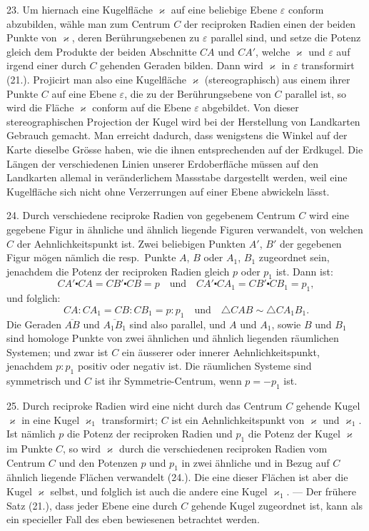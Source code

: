 23. Um hiernach eine Kugelfl\"ache $\varkappa$ auf eine beliebige
Ebene $\varepsilon$ conform abzubilden, w\"ahle man zum Centrum $C$
der reciproken Radien einen der beiden Punkte von $\varkappa$, deren
Ber\"uhrungsebenen zu $\varepsilon$ parallel sind, und setze die Potenz
gleich dem Produkte der beiden Abschnitte $CA$ und $CA'$,
welche $\varkappa$ und $\varepsilon$ auf irgend einer durch $C$ gehenden Geraden
bilden. Dann wird $\varkappa$ in $\varepsilon$ transformirt (21.). Projicirt man
also eine Kugelfl\"ache $\varkappa$ (stereographisch) aus einem ihrer
Punkte $C$ auf eine Ebene $\varepsilon$, die zu der Ber\"uhrungsebene von
$C$ parallel ist, so wird die Fl\"ache $\varkappa$ conform auf die Ebene
$\varepsilon$ abgebildet. Von dieser {\glqq}stereographischen{\grqq} Projection
der Kugel wird bei der Herstellung von Landkarten Gebrauch
gemacht. Man erreicht dadurch, dass wenigstens
die Winkel auf der Karte dieselbe Gr\"osse haben, wie die
ihnen entsprechenden auf der Erdkugel. Die L\"angen der
verschiedenen Linien unserer Erdoberfl\"ache m\"ussen auf den
Landkarten allemal in ver\"anderlichem Massstabe dargestellt
werden, weil eine Kugelfl\"ache sich nicht ohne Verzerrungen
auf einer Ebene abwickeln l\"asst.

24. Durch verschiedene reciproke Radien von gegebenem
Centrum $C$ wird eine gegebene Figur in \"ahnliche und \"ahnlich
liegende Figuren verwandelt, von welchen $C$ der Aehnlichkeitspunkt
ist. Zwei beliebigen Punkten $A'$, $B'$ der gegebenen
Figur m\"ogen n\"amlich die resp.\ Punkte $A$, $B$ oder
$A_1$, $B_1$ zugeordnet sein, jenachdem die Potenz der reciproken
Radien gleich $p$ oder $p_1$ ist. Dann ist:
\[
CA' \centerdot CA = CB' \centerdot CB = p \quad\text{und}\quad
CA' \centerdot CA_1 = CB' \centerdot CB_1 = p_1,
\]
und folglich:
\[
CA : CA_1 = CB : CB_1 = p : p_1 \quad\text{und}\quad
\triangle CAB \sim \triangle CA_1B_1.
\]
Die Geraden $\overline{AB}$ und $\overline{A_1B_1}$ sind also parallel, und $A$ und
$A_1$, sowie $B$ und $B_1$ sind homologe Punkte von zwei \"ahnlichen
und \"ahnlich liegenden r\"aumlichen Systemen; und zwar
ist $C$ ein \"ausserer oder innerer Aehnlichkeitspunkt, jenachdem
$p : p_1$ positiv oder negativ ist. Die r\"aumlichen Systeme
sind symmetrisch und $C$ ist ihr Symmetrie-Centrum, wenn
$p = -p_1$ ist.

25. Durch reciproke Radien wird eine nicht durch das
Centrum $C$ gehende Kugel $\varkappa$ in eine Kugel $\varkappa_1$ transformirt;
$C$ ist ein Aehnlichkeitspunkt von $\varkappa$ und $\varkappa_1$. Ist n\"amlich $p$
die Potenz der reciproken Radien und $p_1$ die Potenz der
Kugel $\varkappa$ %
im Punkte $C$, so wird $\varkappa$ durch die verschiedenen
reciproken Radien vom Centrum $C$ und den Potenzen $p$ und
$p_1$ in zwei \"ahnliche und in Bezug auf $C$ \"ahnlich liegende
Fl\"achen verwandelt (24.). Die eine dieser Fl\"achen ist aber
die Kugel $\varkappa$ selbst, und folglich ist auch die andere eine
Kugel $\varkappa_1$. --- Der fr\"uhere Satz (21.), dass jeder Ebene eine
durch $C$ gehende Kugel zugeordnet ist, kann als ein specieller
Fall des eben bewiesenen betrachtet werden.

